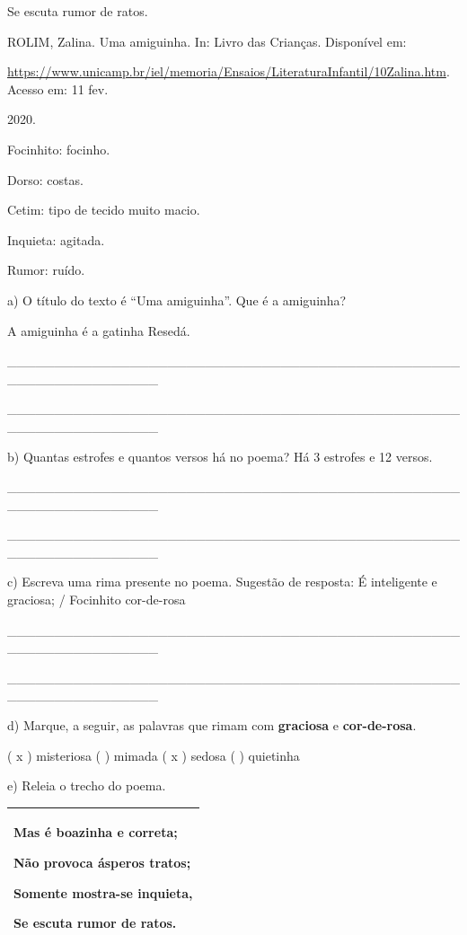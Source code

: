 Se escuta rumor de ratos.

ROLIM, Zalina. Uma amiguinha. In: Livro das Crianças. Disponível em:

\url{https://www.unicamp.br/iel/memoria/Ensaios/LiteraturaInfantil/10Zalina.htm}.
Acesso em: 11 fev.

2020.

Focinhito: focinho.

Dorso: costas.

Cetim: tipo de tecido muito macio.

Inquieta: agitada.

Rumor: ruído.

a) O título do texto é ``Uma amiguinha''. Que é a amiguinha?

A amiguinha é a gatinha Resedá.

\_\_\_\_\_\_\_\_\_\_\_\_\_\_\_\_\_\_\_\_\_\_\_\_\_\_\_\_\_\_\_\_\_\_\_\_\_\_\_\_\_\_\_\_\_\_\_\_\_\_\_\_\_\_\_\_\_\_\_\_\_\_\_\_

\_\_\_\_\_\_\_\_\_\_\_\_\_\_\_\_\_\_\_\_\_\_\_\_\_\_\_\_\_\_\_\_\_\_\_\_\_\_\_\_\_\_\_\_\_\_\_\_\_\_\_\_\_\_\_\_\_\_\_\_\_\_\_\_

b) Quantas estrofes e quantos versos há no poema? Há 3 estrofes e 12
versos.

\_\_\_\_\_\_\_\_\_\_\_\_\_\_\_\_\_\_\_\_\_\_\_\_\_\_\_\_\_\_\_\_\_\_\_\_\_\_\_\_\_\_\_\_\_\_\_\_\_\_\_\_\_\_\_\_\_\_\_\_\_\_\_\_

\_\_\_\_\_\_\_\_\_\_\_\_\_\_\_\_\_\_\_\_\_\_\_\_\_\_\_\_\_\_\_\_\_\_\_\_\_\_\_\_\_\_\_\_\_\_\_\_\_\_\_\_\_\_\_\_\_\_\_\_\_\_\_\_

c) Escreva uma rima presente no poema. Sugestão de resposta: É
inteligente e graciosa; / Focinhito cor-de-rosa

\_\_\_\_\_\_\_\_\_\_\_\_\_\_\_\_\_\_\_\_\_\_\_\_\_\_\_\_\_\_\_\_\_\_\_\_\_\_\_\_\_\_\_\_\_\_\_\_\_\_\_\_\_\_\_\_\_\_\_\_\_\_\_\_

\_\_\_\_\_\_\_\_\_\_\_\_\_\_\_\_\_\_\_\_\_\_\_\_\_\_\_\_\_\_\_\_\_\_\_\_\_\_\_\_\_\_\_\_\_\_\_\_\_\_\_\_\_\_\_\_\_\_\_\_\_\_\_\_

d) Marque, a seguir, as palavras que rimam com \textbf{graciosa} e
\textbf{cor-de-rosa}.

( x ) misteriosa ( ) mimada ( x ) sedosa ( ) quietinha

e) Releia o trecho do poema.

\begin{longtable}[]{@{}l@{}}
\toprule
\begin{minipage}[t]{0.97\columnwidth}\raggedright\strut
Mas é boazinha e correta;

Não provoca ásperos tratos;

Somente mostra-se inquieta,

Se escuta rumor de ratos.\strut
\end{minipage}\tabularnewline
\bottomrule
\end{longtable}

